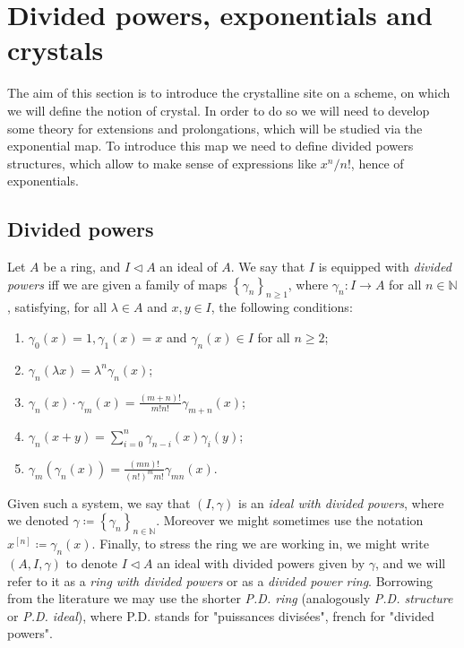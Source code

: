 \section{Divided powers, exponentials and crystals}
The aim of this section is to introduce the crystalline site on a scheme,
on which we will define the notion of crystal.
In order to do so we will need to develop some theory for extensions
and prolongations, which will be studied via the exponential map.
To introduce this map we need to define divided powers structures,
which allow to make sense of expressions like $x^n/n!$, hence of 
exponentials.



\subsection{Divided powers}
\begin{defn}\label{defn:dividedPowers}
	Let $A$ be a ring, and $I \triangleleft A$ an ideal of $A$.
	We say that $I$ is equipped with {\em divided powers} iff
	we are given a family of maps $\left\{ \gamma_n \right\}_{n \geq 1}$,
	where $\gamma_n\colon I \to A$ for all $n \in \mathbb{N}$,
	satisfying, for all $\lambda \in A$ and $x,y \in I$, the following conditions:
	\begin{enumerate}
		\item $\gamma_0(x) = 1, \gamma_1(x) = x$ and 
			$\gamma_n(x) \in I$ for all $n \geq 2$;
		\item $\gamma_n(\lambda x) = \lambda^n \gamma_n(x)$;
		\item $\gamma_n(x) \cdot \gamma_m(x) =
			\frac{\left( m + n \right)!}{m! n!} \gamma_{m+n}(x)$;
		\item $\gamma_n(x+y) = \sum_{i=0}^{n} \gamma_{n-i}(x) \gamma_i(y)$;
		\item $\gamma_m(\gamma_n(x)) = 
			\frac{\left( mn \right)!}{\left( n! \right)^m m!} \gamma_{mn}(x)$.
	\end{enumerate}
	Given such a system, we say that $(I,\gamma)$
	is an {\em ideal with divided powers},
	where we denoted $\gamma \coloneqq \left\{ \gamma_n \right\}_{n \in \mathbb{N}}$.
	Moreover we might sometimes use the notation
	$x^{[n]} \coloneqq \gamma_n(x)$.
	Finally, to stress the ring we are working in, we might write
	$\left(A, I, \gamma\right)$ to denote $I \triangleleft A$
	an ideal with divided powers given by $\gamma$, and 
	we will refer to it as a {\em ring with divided powers}
	or as a {\em divided power ring}.
	Borrowing from the literature we may use the shorter {\em P.D. ring}
	(analogously {\em P.D. structure} or {\em P.D. ideal}), where
	P.D. stands for "puissances divisées", french for "divided powers".
\end{defn}



